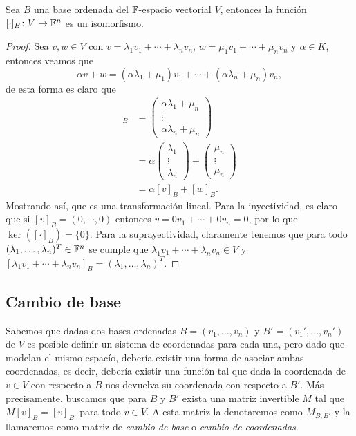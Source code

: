 \begin{prop}
  Sea $B$ una base ordenada del $\mathbb{F}$-espacio vectorial $V$, entonces la función $[\cdot]_B\colon V \to \mathbb{F}^n$ es un isomorfismo.
\end{prop}
\begin{proof}
  Sea $v,w \in V$ con $v = \lambda_1 v_1 + \cdots + \lambda_n v_n$, $w = \mu_1 v_1 + \cdots + \mu_n v_n$ y $\alpha \in K$, entonces veamos que
  \[
  \alpha v+w =  (\alpha\lambda_1+\mu_1) v_1 + \cdots + (\alpha\lambda_n+\mu_n) v_n,
  \]
  de esta forma es claro que
  \begin{align*}
    [v+w]_B 
      &= \begin{pmatrix} \alpha\lambda_1+\mu_n \\ \vdots \\ \alpha\lambda_n+\mu_n \end{pmatrix} \\
      &= \alpha\begin{pmatrix} \lambda_1 \\ \vdots \\ \lambda_n \end{pmatrix}
       + \begin{pmatrix} \mu_n \\ \vdots \\ \mu_n  \end{pmatrix} \\
      &= \alpha[v]_B + [w]_B.
  \end{align*}
  Mostrando así, que es una transformación lineal. Para la inyectividad, es claro que si $[v]_B = (0,\cdots,0)$ entonces $v = 0v_1 + \cdots + 0v_n = 0$, por lo que $\ker([\cdot]_B) = \{0\}$. Para la suprayectividad, claramente tenemos que para todo $(\lambda_1, \ldots, \lambda_n)^T \in \mathbb{F}^n$ se cumple que $\lambda_1 v_1 + \cdots + \lambda_n v_n \in V$ y  $[\lambda_1 v_1 + \cdots  + \lambda_n v_n]_B = (\lambda_1, \ldots, \lambda_n)^T$.
\end{proof}


\subsection{Cambio de base}

Sabemos que dadas dos bases ordenadas $B = (v_1,\ldots,v_n)$ y $B' = (v_1',\ldots,v_n')$ de $V$ es posible definir un sistema de coordenadas para cada una, pero dado que modelan el mismo espacío, debería existir una forma de asociar ambas coordenadas, es decir, debería existir una función tal que dada la coordenada de $v \in V$ con respecto a $B$ nos devuelva su coordenada con respecto a $B'$. Más precisamente, buscamos que para $B$ y $B'$ exista una matriz invertible $M$ tal que $M [v]_B = [v]_{B'}$ para todo $v \in V$. A esta matriz la denotaremos como $M_{B,B'}$ y la llamaremos como matriz de \emph{cambio de base} o \emph{cambio de coordenadas}.

